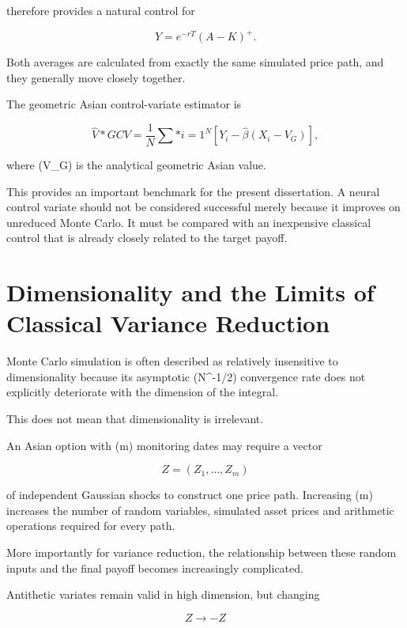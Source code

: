 \documentclass[12pt,a4paper]{report}
\begin{document}
therefore provides a natural control for

\begin{equation}
Y
=
e^{-rT}(A-K)^+.
\end{equation}

Both averages are calculated from exactly the same simulated price path, and they generally move closely together.

The geometric Asian control-variate estimator is

\begin{equation}
\widehat{V}*{GCV}
=
\frac{1}{N}
\sum*{i=1}^{N}
\left[
Y_i
-
\widehat{\beta}
(X_i-V_G)
\right],
\end{equation}

where (V_G) is the analytical geometric Asian value.

This provides an important benchmark for the present dissertation. A neural control variate should not be considered successful merely because it improves on unreduced Monte Carlo. It must be compared with an inexpensive classical control that is already closely related to the target payoff.

\section{Dimensionality and the Limits of Classical Variance Reduction}

Monte Carlo simulation is often described as relatively insensitive to dimensionality because its asymptotic (N^{-1/2}) convergence rate does not explicitly deteriorate with the dimension of the integral.

This does not mean that dimensionality is irrelevant.

An Asian option with (m) monitoring dates may require a vector

\begin{equation}
Z
=
(Z_1,\ldots,Z_m)
\end{equation}

of independent Gaussian shocks to construct one price path. Increasing (m) increases the number of random variables, simulated asset prices and arithmetic operations required for every path.

More importantly for variance reduction, the relationship between these random inputs and the final payoff becomes increasingly complicated.

Antithetic variates remain valid in high dimension, but changing

\begin{equation}
Z
\rightarrow
-Z
\end{equation}
\end{document}
